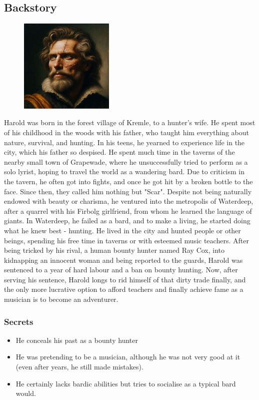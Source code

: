 \documentclass[10pt,onecolumn,twoside,openany,bg=full,layout=true]{dndbook}
\begin{document}
\subsection{Backstory}\label{subsec:harold-backstory}
\begin{figure}
  \begin{center}
    \includegraphics[width=0.4\textwidth]{img/harold}
    \vspace{1cm}
  \end{center}
\end{figure}
Harold was born in the forest village of Kremle, to a hunter's wife.
He spent most of his childhood in the woods with his father, who taught him everything about nature, survival, and hunting.
In his teens, he yearned to experience life in the city, which his father so despised.
He spent much time in the taverns of the nearby small town of Grapewade,
where he unsuccessfully tried to perform as a solo lyrist, hoping to travel the world as a wandering bard.
Due to criticism in the tavern, he often got into fights, and once he got hit by a broken bottle to the face.
Since then, they called him nothing but "Scar".
Despite not being naturally endowed with beauty or charisma, he ventured into the metropolis of Waterdeep, after a
quarrel with his Firbolg girlfriend, from whom he learned the language of giants.
In Waterdeep, he failed as a bard, and to make a living, he started doing what he knew best - hunting.
He lived in the city and hunted people or other beings, spending his free time in taverns or with esteemed music teachers.
After being tricked by his rival, a human bounty hunter named Ray Cox, into kidnapping an innocent woman and
being reported to the guards, Harold was sentenced to a year of hard labour and a ban on bounty hunting.
Now, after serving his sentence, Harold longs to rid himself of that dirty trade finally, and the only more
lucrative option to afford teachers and finally achieve fame as a musician is to become an adventurer.
\subsubsection{Secrets}
  \begin{itemize}
    \item He conceals his past as a bounty hunter
    \item He was pretending to be a musician, although he was not very good at it (even after years, he still made mistakes).
    \item He certainly lacks bardic abilities but tries to socialise as a typical bard would.
  \end{itemize}
\end{document}
